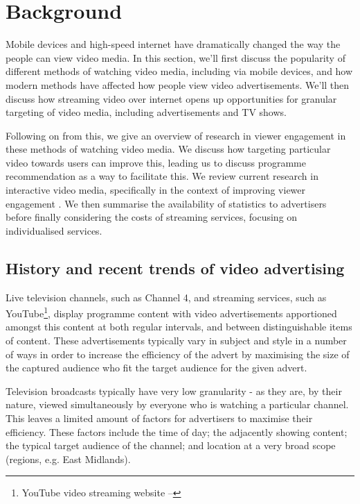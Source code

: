 \section{Background}

Mobile devices and high-speed internet have dramatically changed the way the people can view video media. In this section, we'll first discuss the popularity of different methods of watching video media, including via mobile devices, and how modern methods have affected how people view video advertisements. We'll then discuss how streaming video over internet opens up opportunities for granular targeting of video media, including advertisements and TV shows. 

Following on from this, we give an overview of research in viewer engagement in these methods of watching video media. We discuss how targeting particular video towards users can improve this, leading us to discuss programme recommendation as a way to facilitate this. We review current research in interactive video media, specifically in the context of improving viewer engagement \cite{what_is_engagement}. We then summarise the availability of statistics to advertisers before finally considering the costs of streaming services, focusing on individualised services.

\subsection{History and recent trends of video advertising}

	Live television channels, such as Channel 4, and streaming services, such as YouTube\footnote{YouTube video streaming website -- }, display programme content with video advertisements apportioned amongst this content at both regular intervals, and between distinguishable items of content. These advertisements typically vary in subject and style in a number of ways in order to increase the efficiency of the advert by maximising the size of the captured audience who fit the target audience for the given advert.

	Television broadcasts typically have very low granularity - as they are, by their nature, viewed simultaneously by everyone who is watching a particular channel. This leaves a limited amount of factors for advertisers to maximise their efficiency. These factors include the time of day; the adjacently showing content; the typical target audience of the channel; and location at a very broad scope (regions, e.g. East Midlands).

